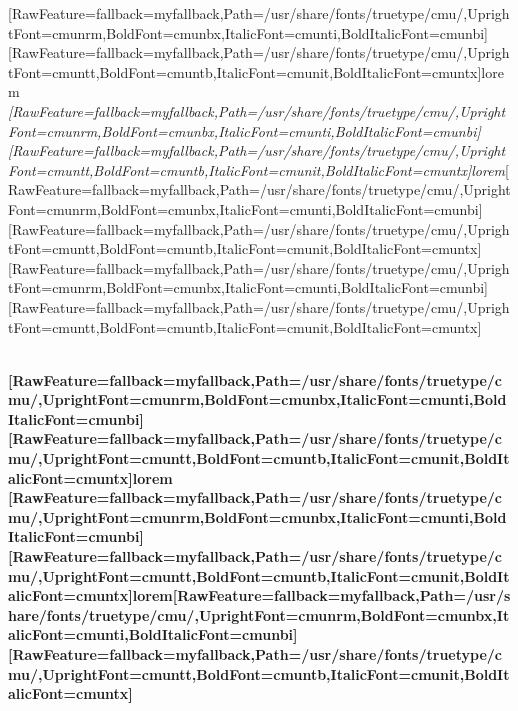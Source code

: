 {\ttfamily {$\text{ }$}\allowbreak{}\setmainfont{cmuntt.ttf}[RawFeature={fallback=myfallback},Path=/usr/share/fonts/truetype/cmu/,UprightFont=cmunrm,BoldFont=cmunbx,ItalicFont=cmunti,BoldItalicFont=cmunbi]\setmonofont{cmuntt.ttf}[RawFeature={fallback=myfallback},Path=/usr/share/fonts/truetype/cmu/,UprightFont=cmuntt,BoldFont=cmuntb,ItalicFont=cmunit,BoldItalicFont=cmuntx]\ttfamily  lorem {\itshape {$\text{ }$}\allowbreak{}\setmainfont{cmunit.ttf}[RawFeature={fallback=myfallback},Path=/usr/share/fonts/truetype/cmu/,UprightFont=cmunrm,BoldFont=cmunbx,ItalicFont=cmunti,BoldItalicFont=cmunbi]\setmonofont{cmunit.ttf}[RawFeature={fallback=myfallback},Path=/usr/share/fonts/truetype/cmu/,UprightFont=cmuntt,BoldFont=cmuntb,ItalicFont=cmunit,BoldItalicFont=cmuntx]\ttfamily \itshape  lorem}\allowbreak{}\setmainfont{cmuntt.ttf}[RawFeature={fallback=myfallback},Path=/usr/share/fonts/truetype/cmu/,UprightFont=cmunrm,BoldFont=cmunbx,ItalicFont=cmunti,BoldItalicFont=cmunbi]\setmonofont{cmuntt.ttf}[RawFeature={fallback=myfallback},Path=/usr/share/fonts/truetype/cmu/,UprightFont=cmuntt,BoldFont=cmuntb,ItalicFont=cmunit,BoldItalicFont=cmuntx]\ttfamily}\allowbreak{}\setmainfont{cmunrm.ttf}[RawFeature={fallback=myfallback},Path=/usr/share/fonts/truetype/cmu/,UprightFont=cmunrm,BoldFont=cmunbx,ItalicFont=cmunti,BoldItalicFont=cmunbi]\setmonofont{cmunrm.ttf}[RawFeature={fallback=myfallback},Path=/usr/share/fonts/truetype/cmu/,UprightFont=cmuntt,BoldFont=cmuntb,ItalicFont=cmunit,BoldItalicFont=cmuntx]

{\bfseries {$\text{ }$}\allowbreak{}\setmainfont{cmunbx.ttf}[RawFeature={fallback=myfallback},Path=/usr/share/fonts/truetype/cmu/,UprightFont=cmunrm,BoldFont=cmunbx,ItalicFont=cmunti,BoldItalicFont=cmunbi]\setmonofont{cmunbx.ttf}[RawFeature={fallback=myfallback},Path=/usr/share/fonts/truetype/cmu/,UprightFont=cmuntt,BoldFont=cmuntb,ItalicFont=cmunit,BoldItalicFont=cmuntx]\bfseries  lorem {\ttfamily {$\text{ }$}\allowbreak{}\setmainfont{cmuntb.ttf}[RawFeature={fallback=myfallback},Path=/usr/share/fonts/truetype/cmu/,UprightFont=cmunrm,BoldFont=cmunbx,ItalicFont=cmunti,BoldItalicFont=cmunbi]\setmonofont{cmuntb.ttf}[RawFeature={fallback=myfallback},Path=/usr/share/fonts/truetype/cmu/,UprightFont=cmuntt,BoldFont=cmuntb,ItalicFont=cmunit,BoldItalicFont=cmuntx]\ttfamily \bfseries  lorem}\allowbreak{}\setmainfont{cmunbx.ttf}[RawFeature={fallback=myfallback},Path=/usr/share/fonts/truetype/cmu/,UprightFont=cmunrm,BoldFont=cmunbx,ItalicFont=cmunti,BoldItalicFont=cmunbi]\setmonofont{cmunbx.ttf}[RawFeature={fallback=myfallback},Path=/usr/share/fonts/truetype/cmu/,UprightFont=cmuntt,BoldFont=cmuntb,ItalicFont=cmunit,BoldItalicFont=cmuntx]\bfseries}
